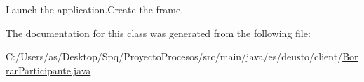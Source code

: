 Launch the application.\+Create the frame. 

The documentation for this class was generated from the following file\+:\begin{DoxyCompactItemize}
\item 
C\+:/\+Users/as/\+Desktop/\+Spq/\+Proyecto\+Procesos/src/main/java/es/deusto/client/\mbox{\hyperlink{_borrar_participante_8java}{Borrar\+Participante.\+java}}\end{DoxyCompactItemize}
